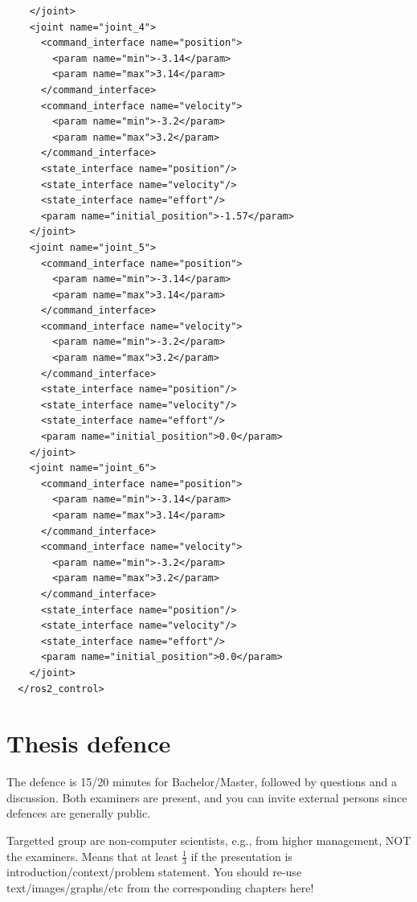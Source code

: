 \documentclass[12pt,oneside]{article}
\begin{document}
\begin{mdframed}[linecolor=black, topline=false, bottomline=false,leftline=false, rightline=false, backgroundcolor=white]
\begin{verbatim}
    </joint>
    <joint name="joint_4">
      <command_interface name="position">
        <param name="min">-3.14</param>
        <param name="max">3.14</param>
      </command_interface>
      <command_interface name="velocity">
        <param name="min">-3.2</param>
        <param name="max">3.2</param>
      </command_interface>
      <state_interface name="position"/>
      <state_interface name="velocity"/>
      <state_interface name="effort"/>
      <param name="initial_position">-1.57</param>
    </joint>
    <joint name="joint_5">
      <command_interface name="position">
        <param name="min">-3.14</param>
        <param name="max">3.14</param>
      </command_interface>
      <command_interface name="velocity">
        <param name="min">-3.2</param>
        <param name="max">3.2</param>
      </command_interface>
      <state_interface name="position"/>
      <state_interface name="velocity"/>
      <state_interface name="effort"/>
      <param name="initial_position">0.0</param>
    </joint>
    <joint name="joint_6">
      <command_interface name="position">
        <param name="min">-3.14</param>
        <param name="max">3.14</param>
      </command_interface>
      <command_interface name="velocity">
        <param name="min">-3.2</param>
        <param name="max">3.2</param>
      </command_interface>
      <state_interface name="position"/>
      <state_interface name="velocity"/>
      <state_interface name="effort"/>
      <param name="initial_position">0.0</param>
    </joint>
  </ros2_control>
\end{verbatim}
\end{mdframed}


\section{Thesis defence}
The defence is 15/20 minutes for Bachelor/Master, followed by questions and a discussion. Both examiners are present, and you can invite external persons since defences are generally public.

Targetted group are non-computer scientists, e.g., from higher management, NOT the examiners. Means that at least $\frac 1 3$ if the presentation is introduction/context/problem statement. You should re-use text/images/graphs/etc from the corresponding chapters here!
\end{document}
